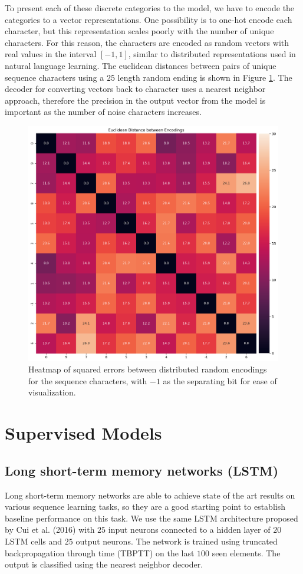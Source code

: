\documentclass{article}
\begin{document}
To present each of these discrete categories to the model, we have to encode the categories to a vector representations. One possibility is to one-hot encode each character, but this representation scales poorly with the number of unique characters. For this reason, the characters are encoded as random vectors with real values in the interval $\left[-1, 1\right]$, similar to distributed representations used in natural language learning. \cite{mikolov2013distributed} The euclidean distances between pairs of unique sequence characters using a $25$ length random ending is shown in Figure \ref{fig:encoding-distance}. The decoder for converting vectors back to character uses a nearest neighbor approach, therefore the precision in the output vector from the model is important as the number of noise characters increases. 

\begin{figure}[H]
    \centering
    \includegraphics[width=0.6\linewidth]{../notebooks/matrix-distances.png}
    \caption{Heatmap of squared errors between distributed random encodings for the sequence characters, with $-1$ as the separating bit for ease of visualization.}
    \label{fig:encoding-distance}
\end{figure}

\section*{Supervised Models}

\subsection*{Long short-term memory networks (LSTM)}

Long short-term memory \cite{hochreiter1997long} networks are able to achieve state of the art results on various sequence learning tasks, so they are a good starting point to establish baseline performance on this task. We use the same LSTM architecture proposed by Cui et al. (2016) with $25$ input neurons connected to a hidden layer of $20$ LSTM cells and $25$ output neurons. The network is trained using truncated backpropagation through time (TBPTT) \cite{mozer1995focused, sutskever2013training} on the last $100$ seen elements. The output is classified using the nearest neighbor decoder.
\end{document}

